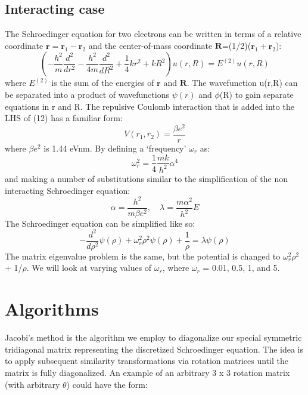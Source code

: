 \documentclass[10pt,showpacs,preprintnumbers,footinbib,amsmath,amssymb,aps,prl,twocolumn,groupedaddress,superscriptaddress,showkeys]{revtex4-1}
\begin{document}
	\subsection{Interacting case}	
The Schroedinger equation for two electrons can be written in terms of a relative coordinate ${\mathbf r =\mathbf  r_{1} - \mathbf r_{2}}$ and the center-of-mass coordinate ${\mathbf R}$=(1/2)(${\mathbf r_{1}+ \mathbf r_{2}}$):
\begin{equation}
\left(-\frac{h^{2}}{m}\frac{d^{2}}{dr^{2}} - \frac{h^{2}}{4m}\frac{d^{2}}{dR^{2}} + \frac{1}{4}kr^{2} + kR^{2}\right)u(r,R) = E^{(2)}u(r,R)
\end{equation}
where $E^{(2)}$ is the sum of the energies of ${\mathbf r}$ and ${\mathbf R}$. The wavefunction u(r,R) can be separated into a product of wavefunctions $\psi(r)$ and $\phi$(R) to gain separate equations in r and R. The repulsive Coulomb interaction that is added into the LHS of (12) has a familiar form:
\begin{equation}
V(r_{1},r_{2}) = \frac{\beta e^{2}}{r}
\end{equation}
where ${\beta e^{2}}$ is 1.44 eVnm. By defining a `frequency' $\omega_{r}$ as:
\begin{equation}
\omega_{r}^{2} = \frac{1}{4}\frac{mk}{h^{2}}\alpha^{4}
\end{equation}
and making a number of substitutions similar to the simplification of the non interacting Schroedinger equation:
\begin{equation}
\alpha = \frac{h^2}{m\beta e^{2}},\quad \lambda = \frac{m\alpha^{2}}{h^{2}}E
\end{equation}
The Schroedinger equation can be simplified like so:
\begin{equation}
-\frac{d^{2}}{d\rho^{2}}\psi(\rho) + \omega_{r}^{2}\rho^{2}\psi(\rho) + \frac{1}{\rho} = \lambda \psi(\rho) 
\end{equation}
 The matrix eigenvalue problem is the same, but the potential is changed to $\omega_{r}^{2}\rho^{2}$ + 1/$\rho$. We will look at varying values of $\omega_{r}$, where $\omega_{r}$ = 0.01, 0.5, 1, and 5.
	
\section{Algorithms} \label{sec:algo}	
Jacobi's method is the algorithm we employ to diagonalize our special symmetric tridiagonal matrix representing the discretized Schroedinger equation. The idea is to apply subsequent similarity transformations via rotation matrices until the matrix is fully diagonalized.
An example of an arbitrary 3 x 3 rotation matrix (with arbitrary $\theta$) could have the form:
\end{document}
